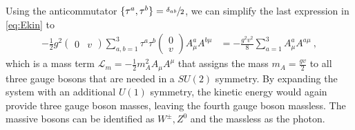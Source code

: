 Using the anticommutator $\{\tau^a,\tau^b\}=\sfrac{\delta_{ab}}{2}$, we can simplify the last expression in \ref{eq:Ekin} to
\begin{align}
	- \frac{1}{2}g^2\begin{pmatrix} 0 & v \end{pmatrix}\sum_{a,b=1}^{3}\tau^a\tau^b\begin{pmatrix} 0 \\ v \end{pmatrix}A_\mu^aA^{b\mu} &= - \frac{g^2v^2}{8}\sum_{a=1}^{3}A_\mu^aA^{a\mu} \ ,
\end{align}
which is a mass term $\mathcal{L}_m = -\frac{1}{2}m_A^2A_\mu A^\mu$ that assigns the mass $m_A = \frac{gv}{2}$ to all three gauge bosons that are needed in a $SU(2)$ symmetry. By expanding the system with an additional $U(1)$ symmetry, the kinetic energy would again provide three gauge boson masses, leaving the fourth gauge boson massless. The massive bosons can be identified as $W^\pm,Z^0$ and the massless as the photon.


